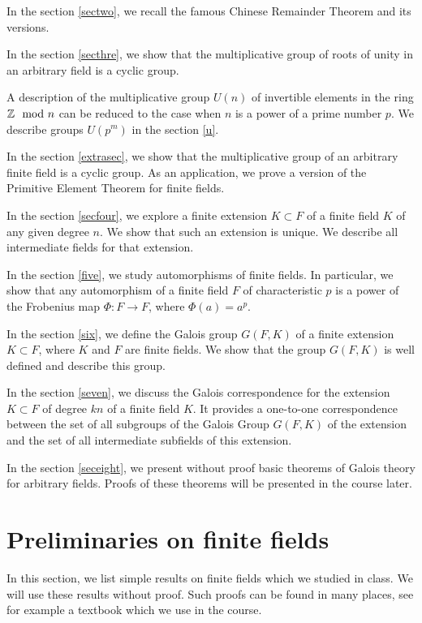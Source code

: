 \documentclass[11pt]{article}
\theoremstyle{plain}
\theoremstyle{definition}
\begin{document}
In the section \ref{sectwo},
we recall the famous  Chinese  Remainder  Theorem and its versions.

In the section \ref{secthre}, we show that the multiplicative group of roots of unity in an arbitrary  field is a cyclic group.

A description of the multiplicative group $U(n)$ of invertible elements in the ring $\Bbb Z \mod n$ can be reduced to the case when $n$ is a power of a prime number $p$.  We describe groups $U(p^m)$ in the section \ref{u}.

In the section \ref{extrasec},
 we show that the multiplicative group of an arbitrary finite field is a cyclic group. As an application, we prove a version of the Primitive Element Theorem for finite fields.

In the section \ref{secfour},
we explore a  finite extension $K\subset F$ of a finite field $K$ of  any given degree $n$. We show that such an extension is  unique. We  describe all intermediate fields for that extension.

In the section \ref{five},
we study automorphisms of finite fields. In particular, we show that any automorphism of a finite field $F$ of characteristic $p$ is a power of the Frobenius map $\Phi:F\to F$, where $\Phi(a)=a^p$.

In the section \ref{six},
we define the Galois group $G(F,K)$ of a finite extension $K\subset F$, where $K$ and $F$ are finite fields. We show that the group $G(F,K)$ is well defined and describe this group.

In the section \ref{seven},
we discuss the Galois correspondence for the extension $K\subset F$ of degree $kn$  of a finite field $K$. It provides a one-to-one correspondence
between the set of all subgroups  of the Galois Group $G(F,K)$ of the  extension  and  the set of all intermediate subfields  of this extension.

In the section \ref{seceight},
we present without proof basic theorems of Galois theory  for arbitrary fields. Proofs of these theorems will be presented in the course later.

\section{Preliminaries  on finite fields}\label{prelim}
In this section, we list  simple results on finite fields which we studied in class. We will use these results without proof. Such proofs can be found in many places, see for example a textbook \cite{Rotman} which we use in the course.
\end{document}
